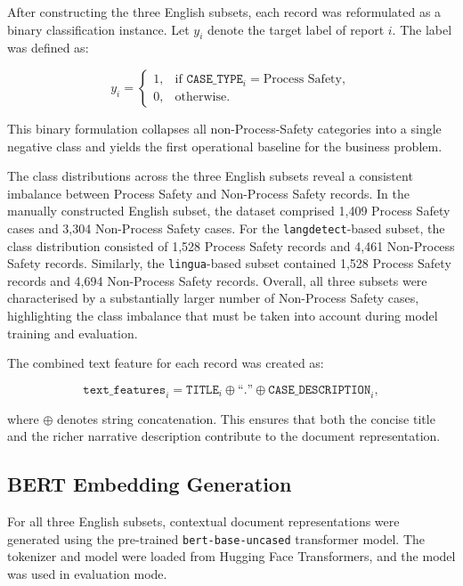 \documentclass[11pt, titlepage, bibliography=totoc]{scrreprt}
\begin{document}
After constructing the three English subsets, each record was reformulated as a binary classification instance. Let $y_i$ denote the target label of report $i$. The label was defined as:

\begin{equation}
y_i =
\begin{cases}
1, & \text{if } \texttt{CASE\_TYPE}_i = \text{Process Safety},\\[0.5em]
0, & \text{otherwise}.
\end{cases}
\end{equation}

This binary formulation collapses all non-Process-Safety categories into a single negative class and yields the first operational baseline for the business problem.

The class distributions across the three English subsets reveal a consistent imbalance between Process Safety and Non-Process Safety records. In the manually constructed English subset, the dataset comprised 1,409 Process Safety cases and 3,304 Non-Process Safety cases. For the \texttt{langdetect}-based subset, the class distribution consisted of 1,528 Process Safety records and 4,461 Non-Process Safety records. Similarly, the \texttt{lingua}-based subset contained 1,528 Process Safety records and 4,694 Non-Process Safety records. Overall, all three subsets were characterised by a substantially larger number of Non-Process Safety cases, highlighting the class imbalance that must be taken into account during model training and evaluation.

The combined text feature for each record was created as:

\begin{equation}
\texttt{text\_features}_i = \texttt{TITLE}_i \oplus \text{``.''} \oplus \texttt{CASE\_DESCRIPTION}_i,
\end{equation}

where $\oplus$ denotes string concatenation. This ensures that both the concise title and the richer narrative description contribute to the document representation.

\subsection{BERT Embedding Generation}

For all three English subsets, contextual document representations were generated using the pre-trained \texttt{bert-base-uncased} transformer model. The tokenizer and model were loaded from Hugging Face Transformers, and the model was used in evaluation mode.
\end{document}
